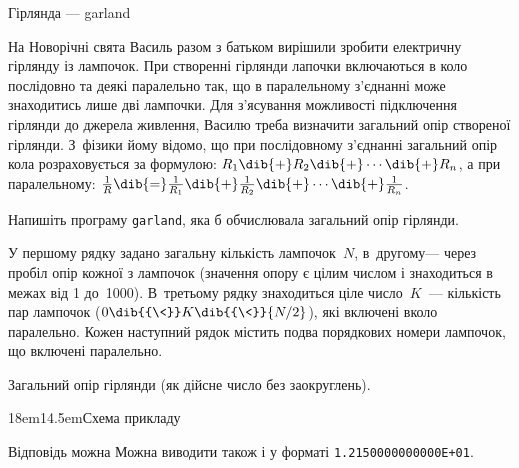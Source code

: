 \begin{problemAllDefault}{Гірлянда --- garland}


На Новорічні свята Василь разом з батьком вирішили зробити електричну гірлянду із лампочок. При створенні гірлянди лапочки включаються в коло послідовно та деякі паралельно так, що в паралельному з’єднанні може знаходитись лише дві лампочки. Для з’ясування можливості підключення гірлянди до джерела живлення, Василю треба визначити загальний опір створеної гірлянди. З~фізики йому відомо, що при послідовному з’єднанні загальний опір кола розраховується за формулою: $R_1\dib{{+}}R_2\dib{{+}}\cdots\dib{{+}}R_n$, а при паралельному: $\frac{1}{R} \dib{{=}} \frac{1}{R_1} \dib{{+}} \frac{1}{R_2} \dib{{+}} \cdots \dib{{+}} \frac{1}{R_n}$.

Напишіть програму \texttt{garland}, яка б обчислювала загальний опір гірлянди.

\InputFile У першому рядку задано загальну кількість лампочок~$N$, в~другому\nolinebreak[3] --- через пробіл опір кожної з лампочок (значення опору є цілим числом і знаходиться в межах від 1 до~1000). В~третьому рядку знаходиться ціле число~$K$~--- кількість пар лампочок ($0\dib{{\<}}K\dib{{\<}}{N/2}$), які включені в\nolinebreak[3] коло паралельно. Кожен наступний рядок містить по\nolinebreak[2] два порядкових номери лампочок, що включені паралельно.

\OutputFile Загальний опір гірлянди (як дійсне число без заокруглень).


\Example
%
%
\begin{exampleSimpleThree}{6em}{3em}{\ifAfour 18em\else 14.5em\fi}{Схема прикладу}
%
\end{exampleSimpleThree}



\Note
\ifAfour
Відповідь можна
\else
Можна 
\fi
виводити також і у форматі \texttt{1.2150000000000E+01}.

\end{problemAllDefault}
